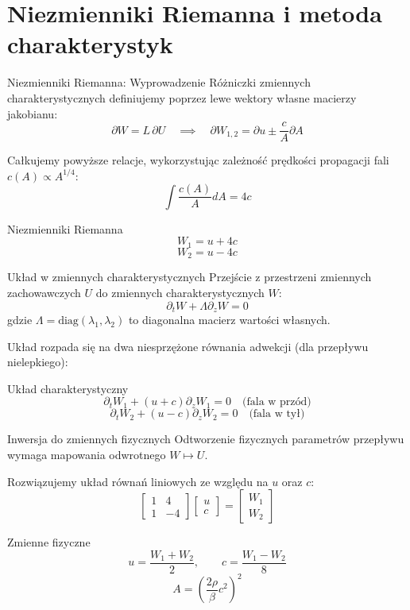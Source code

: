\documentclass[aspectratio=169]{beamer}
\begin{document}
\section{Niezmienniki Riemanna i metoda charakterystyk}
\begin{frame}{Niezmienniki Riemanna: Wyprowadzenie}
Różniczki zmiennych charakterystycznych definiujemy poprzez lewe wektory własne macierzy jakobianu:
$$ \partial W = L\,\partial U \quad \implies \quad \partial W_{1,2} = \partial u \pm \frac{c}{A} \partial A $$

Całkujemy powyższe relacje, wykorzystując zależność prędkości propagacji fali $c(A) \propto A^{1/4}$:
$$ \int \frac{c(A)}{A} dA = 4c $$

\begin{block}{Niezmienniki Riemanna}
$$ W_1 = u + 4c $$
$$ W_2 = u - 4c $$
\end{block}
\end{frame}
\begin{frame}{Układ w zmiennych charakterystycznych}
Przejście z przestrzeni zmiennych zachowawczych $U$ do zmiennych charakterystycznych $W$:
$$ \partial_t W + \Lambda \partial_z W = 0 $$
gdzie $\Lambda = \text{diag}(\lambda_1, \lambda_2)$ to diagonalna macierz wartości własnych.

Układ rozpada się na dwa niesprzężone równania adwekcji (dla przepływu nielepkiego):
\begin{block}{Układ charakterystyczny}
$$ \partial_t W_1 + (u+c) \partial_z W_1 = 0 \quad \text{(fala w przód)} $$
$$ \partial_t W_2 + (u-c) \partial_z W_2 = 0 \quad \text{(fala w tył)} $$
\end{block}
\end{frame}
\begin{frame}{Inwersja do zmiennych fizycznych}
Odtworzenie fizycznych parametrów przepływu wymaga mapowania odwrotnego $W \mapsto U$.

Rozwiązujemy układ równań liniowych ze względu na $u$ oraz $c$:
$$ \begin{bmatrix} 1 & 4 \\ 1 & -4 \end{bmatrix} \begin{bmatrix} u \\ c \end{bmatrix} = \begin{bmatrix} W_1 \\ W_2 \end{bmatrix} $$

\begin{block}{Zmienne fizyczne}
$$ u = \frac{W_1 + W_2}{2}, \qquad c = \frac{W_1 - W_2}{8} $$
$$ A = \left( \frac{2\rho}{\beta} c^2 \right)^2 $$
\end{block}
\end{frame}
\end{document}
